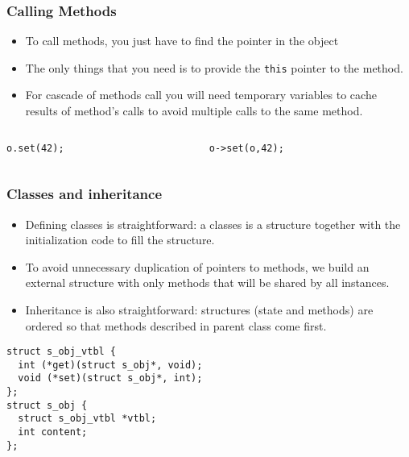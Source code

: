 \documentclass{beamer}
\begin{document}
\begin{frame}[fragile]
  \frametitle{Calling Methods}
  \begin{itemize}
  \item To call methods, you just have to find the pointer in the object
  \item The only things that you need is to provide the \texttt{this} pointer
    to the method.
  \item For cascade of methods call you will need temporary variables to cache
    results of method's calls to avoid multiple calls to the same method.
  \end{itemize}
  \begin{BoxedExample}
    \footnotesize
    \begin{columns}
      \begin{column}{4.5cm}
\begin{lstlisting}
o.set(42);
\end{lstlisting}
      \end{column}
      \begin{column}{4.5cm}
\begin{lstlisting}
o->set(o,42);
\end{lstlisting}
      \end{column}
    \end{columns}
  \end{BoxedExample}

\end{frame}

\begin{frame}[fragile]
  \frametitle{Classes and inheritance}
  \begin{itemize}
  \item Defining classes is straightforward: a classes is a structure together
    with the initialization code to fill the structure.
  \item To avoid unnecessary duplication of pointers to methods, we build an
    external structure with only methods that will be shared by all instances.
  \item Inheritance is also straightforward: structures (state and methods)
    are ordered so that methods described in parent class come first.
  \end{itemize}
  \begin{BoxedExample}
    \footnotesize
\begin{lstlisting}
struct s_obj_vtbl {
  int (*get)(struct s_obj*, void);
  void (*set)(struct s_obj*, int);
};
struct s_obj {
  struct s_obj_vtbl *vtbl;
  int content;
};
\end{lstlisting}
  \end{BoxedExample}
\end{frame}
\end{document}

